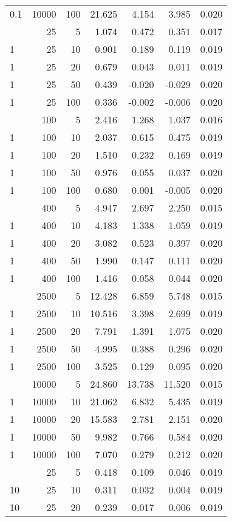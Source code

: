 \begin{table}
\begin{tabular}[t]{lrrrrrr}
0.1 & 10000 & 100 & 21.625 & 4.154 & 3.985 & 0.020\\
\addlinespace
1 & 25 & 5 & 1.074 & 0.472 & 0.351 & 0.017\\
1 & 25 & 10 & 0.901 & 0.189 & 0.119 & 0.019\\
1 & 25 & 20 & 0.679 & 0.043 & 0.011 & 0.019\\
1 & 25 & 50 & 0.439 & -0.020 & -0.029 & 0.020\\
1 & 25 & 100 & 0.336 & -0.002 & -0.006 & 0.020\\
\addlinespace
1 & 100 & 5 & 2.416 & 1.268 & 1.037 & 0.016\\
1 & 100 & 10 & 2.037 & 0.615 & 0.475 & 0.019\\
1 & 100 & 20 & 1.510 & 0.232 & 0.169 & 0.019\\
1 & 100 & 50 & 0.976 & 0.055 & 0.037 & 0.020\\
1 & 100 & 100 & 0.680 & 0.001 & -0.005 & 0.020\\
\addlinespace
1 & 400 & 5 & 4.947 & 2.697 & 2.250 & 0.015\\
1 & 400 & 10 & 4.183 & 1.338 & 1.059 & 0.019\\
1 & 400 & 20 & 3.082 & 0.523 & 0.397 & 0.020\\
1 & 400 & 50 & 1.990 & 0.147 & 0.111 & 0.020\\
1 & 400 & 100 & 1.416 & 0.058 & 0.044 & 0.020\\
\addlinespace
1 & 2500 & 5 & 12.428 & 6.859 & 5.748 & 0.015\\
1 & 2500 & 10 & 10.516 & 3.398 & 2.699 & 0.019\\
1 & 2500 & 20 & 7.791 & 1.391 & 1.075 & 0.020\\
1 & 2500 & 50 & 4.995 & 0.388 & 0.296 & 0.020\\
1 & 2500 & 100 & 3.525 & 0.129 & 0.095 & 0.020\\
\addlinespace
1 & 10000 & 5 & 24.860 & 13.738 & 11.520 & 0.015\\
1 & 10000 & 10 & 21.062 & 6.832 & 5.435 & 0.019\\
1 & 10000 & 20 & 15.583 & 2.781 & 2.151 & 0.020\\
1 & 10000 & 50 & 9.982 & 0.766 & 0.584 & 0.020\\
1 & 10000 & 100 & 7.070 & 0.279 & 0.212 & 0.020\\
\addlinespace
10 & 25 & 5 & 0.418 & 0.109 & 0.046 & 0.019\\
10 & 25 & 10 & 0.311 & 0.032 & 0.004 & 0.019\\
10 & 25 & 20 & 0.239 & 0.017 & 0.006 & 0.019\\

\end{tabular}
\end{table}
